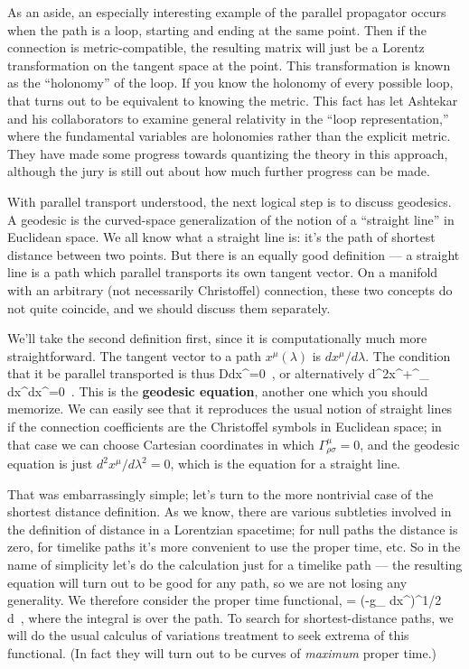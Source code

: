 \documentclass[12pt]{article}
\begin{document}
As an aside, an especially interesting example of the parallel
propagator occurs when the path is a loop, starting and ending at the
same point.  Then if the connection is metric-compatible, the
resulting matrix will just be a Lorentz transformation on the tangent
space at the point.  This transformation is known as the ``holonomy''
of the loop.  If you know the holonomy of every possible loop, that 
turns out to be equivalent to knowing the metric.  This fact has let
Ashtekar and his collaborators to examine general relativity in
the ``loop representation,'' where the fundamental variables are 
holonomies rather than the explicit metric.  They have made some
progress towards quantizing the theory in this approach, although the
jury is still out about how much further progress can be made.

With parallel transport understood, the next logical step is to
discuss geodesics.  A geodesic is the curved-space generalization
of the notion of a ``straight line'' in Euclidean space.  We all
know what a straight line is: it's the path of shortest distance
between two points.  But there is an equally good definition ---
a straight line is a path which parallel transports its own
tangent vector.  On a manifold with an arbitrary (not necessarily
Christoffel) connection, these two concepts do not quite coincide,
and we should discuss them separately.

We'll take the second definition first, since it is computationally
much more straightforward.  The tangent vector to a path $x^\mu(\lambda)$
is $dx^\mu/d\lambda$.  The condition that it be parallel transported 
is thus
\be
  {{D}}{{dx^\mu}}=0\ ,\label{3.46}
\ee
or alternatively
\be
  {{d^2x^\mu}}+\Gamma^\mu_{\rho\sigma}
  {{dx^\rho}}{{dx^\sigma}}=0\ .
  \label{3.47}
\ee
This is the {\bf geodesic equation}, another one which you should
memorize.  We can easily see that it reproduces the usual notion
of straight lines if the connection coefficients are the Christoffel
symbols in Euclidean space; in that case we can choose Cartesian
coordinates in which $\Gamma^\mu_{\rho\sigma}=0$, and the geodesic
equation is just $d^2x^\mu/d\lambda^2=0$, which is the equation for
a straight line.

That was embarrassingly simple; let's turn to the more nontrivial case
of the shortest distance definition.  As we know, there are various
subtleties involved in the definition of distance in a Lorentzian
spacetime; for null paths the distance is zero, for timelike paths
it's more convenient to use the proper time, etc.  So in the name of
simplicity let's do the calculation just for a timelike path ---
the resulting equation will turn
out to be good for any path, so we are not losing
any generality.  We therefore consider the proper time functional,
\be
  \tau = \int \left(-g_
  {{dx^\nu}}\right)^{1/2}\, d\lambda\ ,\label{3.48}
\ee
where the integral is over the path.  To search for shortest-distance
paths, we will do the usual calculus of variations treatment to seek
extrema of this functional.  (In fact they will turn out to be curves
of {\it maximum} proper time.)
\end{document}

